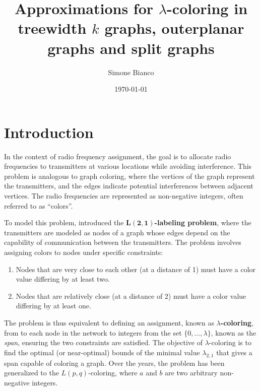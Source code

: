 \documentclass[12pt,a4paper]{article}
\newcommand{\curlyquotes}[1]{\textquotedblleft #1\textquotedblright}
\begin{document}
    \title{Approximations for $\lambda$-coloring in treewidth $k$ graphs, outerplanar graphs and split graphs}
    \author{Simone Bianco}
    \date{\today}

    \maketitle


    \tableofcontents
    \newpage

	\hypersetup{linkcolor=blue}

    \section{Introduction}

    
    In the context of radio frequency assignment, the goal is to allocate radio frequencies to transmitters at various locations while avoiding interference. This problem is analogous to graph coloring, where the vertices of the graph represent the transmitters, and the edges indicate potential interferences between adjacent vertices. The radio frequencies are represented as non-negative integers, often referred to as \curlyquotes{colors}.
    
    To model this problem, \textcite{L21_color} introduced the \textbf{$\mathbf{L(2, 1)}$-labeling problem}, where the transmitters are modeled as nodes of a graph whose edges depend on the capability of communication between the transmitters. The problem involves assigning colors to nodes under specific constraints:
    \begin{enumerate}
        \item Nodes that are very close to each other (at a distance of 1) must have a color value differing by at least two.
        \item Nodes that are relatively close (at a distance of 2) must have a color value differing by at least one.
    \end{enumerate}

    The problem is thus equivalent to defining an assignment, known as \textbf{$\lambda$-coloring}, from to each node in the network to integers from the set $\{0, \dots, \lambda\}$, known as the \textit{span}, ensuring the two constraints are satisfied. The objective of $\lambda$-coloring is to find the optimal (or near-optimal) bounds of the minimal value $\lambda_{2,1}$ that gives a span capable of coloring a graph. Over the years, the problem has been generalized to the $L(p,q)$-coloring, where $a$ and $b$ are two arbitrary non-negative integers.
    
\end{document}
